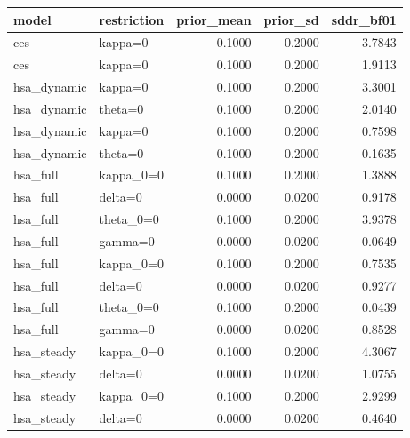 \begin{tabular}{llrrr}
\toprule
model & restriction & prior\_mean & prior\_sd & sddr\_bf01 \\
\midrule
ces & kappa=0 & 0.1000 & 0.2000 & 3.7843 \\
ces & kappa=0 & 0.1000 & 0.2000 & 1.9113 \\
hsa\_dynamic & kappa=0 & 0.1000 & 0.2000 & 3.3001 \\
hsa\_dynamic & theta=0 & 0.1000 & 0.2000 & 2.0140 \\
hsa\_dynamic & kappa=0 & 0.1000 & 0.2000 & 0.7598 \\
hsa\_dynamic & theta=0 & 0.1000 & 0.2000 & 0.1635 \\
hsa\_full & kappa\_0=0 & 0.1000 & 0.2000 & 1.3888 \\
hsa\_full & delta=0 & 0.0000 & 0.0200 & 0.9178 \\
hsa\_full & theta\_0=0 & 0.1000 & 0.2000 & 3.9378 \\
hsa\_full & gamma=0 & 0.0000 & 0.0200 & 0.0649 \\
hsa\_full & kappa\_0=0 & 0.1000 & 0.2000 & 0.7535 \\
hsa\_full & delta=0 & 0.0000 & 0.0200 & 0.9277 \\
hsa\_full & theta\_0=0 & 0.1000 & 0.2000 & 0.0439 \\
hsa\_full & gamma=0 & 0.0000 & 0.0200 & 0.8528 \\
hsa\_steady & kappa\_0=0 & 0.1000 & 0.2000 & 4.3067 \\
hsa\_steady & delta=0 & 0.0000 & 0.0200 & 1.0755 \\
hsa\_steady & kappa\_0=0 & 0.1000 & 0.2000 & 2.9299 \\
hsa\_steady & delta=0 & 0.0000 & 0.0200 & 0.4640 \\
\bottomrule
\end{tabular}
